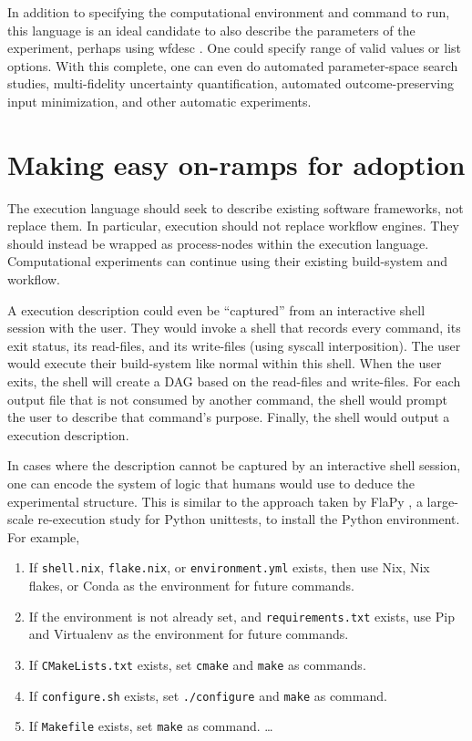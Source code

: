 \documentclass[manuscript,authordraft]{acmart}
\providecommand{\tightlist}{\setlength{\itemsep}{0pt}\setlength{\parskip}{0pt}}
\begin{document}
In addition to specifying the computational environment and command to
run, this language is an ideal candidate to also describe the parameters
of the experiment, perhaps using wfdesc
\cite{soiland-reyes_wf4ever_2013}. One could specify range of valid
values or list options. With this complete, one can even do automated
parameter-space search studies, multi-fidelity uncertainty
quantification, automated outcome-preserving input minimization, and
other automatic experiments.

\hypertarget{making-easy-on-ramps-for-adoption}{%
\section{Making easy on-ramps for
adoption}\label{making-easy-on-ramps-for-adoption}}

The execution language should seek to describe existing software
frameworks, not replace them. In particular, execution should not
replace workflow engines. They should instead be wrapped as
process-nodes within the execution language. Computational experiments
can continue using their existing build-system and workflow.

A execution description could even be ``captured'' from an interactive
shell session with the user. They would invoke a shell that records
every command, its exit status, its read-files, and its write-files
(using syscall interposition). The user would execute their build-system
like normal within this shell. When the user exits, the shell will
create a DAG based on the read-files and write-files. For each output
file that is not consumed by another command, the shell would prompt the
user to describe that command's purpose. Finally, the shell would output
a execution description.

In cases where the description cannot be captured by an interactive
shell session, one can encode the system of logic that humans would use
to deduce the experimental structure. This is similar to the approach
taken by FlaPy \cite{gruber_empirical_2021}, a large-scale re-execution
study for Python unittests, to install the Python environment. For
example,

\begin{enumerate}
\def\labelenumi{\arabic{enumi}.}
\tightlist
\item
  If \texttt{shell.nix}, \texttt{flake.nix}, or \texttt{environment.yml}
  exists, then use Nix, Nix flakes, or Conda as the environment for
  future commands.
\item
  If the environment is not already set, and \texttt{requirements.txt}
  exists, use Pip and Virtualenv as the environment for future commands.
\item
  If \texttt{CMakeLists.txt} exists, set \texttt{cmake} and
  \texttt{make} as commands.
\item
  If \texttt{configure.sh} exists, set \texttt{./configure} and
  \texttt{make} as command.
\item
  If \texttt{Makefile} exists, set \texttt{make} as command. \ldots{}
\end{enumerate}
\end{document}
